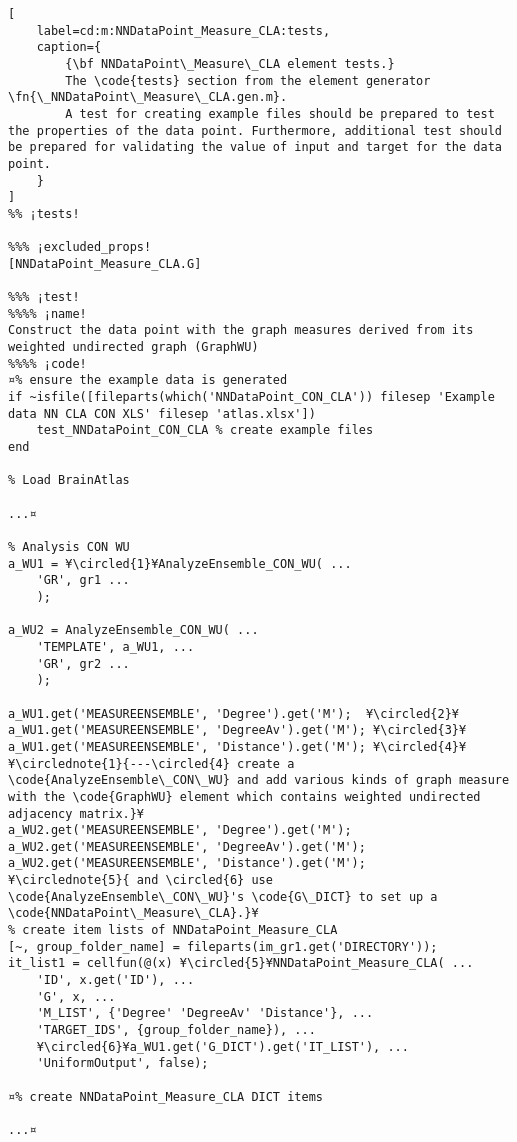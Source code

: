\documentclass{tufte-handout}
\begin{document}
\begin{lstlisting}[
	label=cd:m:NNDataPoint_Measure_CLA:tests,
	caption={
		{\bf NNDataPoint\_Measure\_CLA element tests.}
		The \code{tests} section from the element generator \fn{\_NNDataPoint\_Measure\_CLA.gen.m}.
		A test for creating example files should be prepared to test the properties of the data point. Furthermore, additional test should be prepared for validating the value of input and target for the data point.
	}
]		
%% ¡tests!

%%% ¡excluded_props!
[NNDataPoint_Measure_CLA.G]

%%% ¡test!
%%%% ¡name! 
Construct the data point with the graph measures derived from its weighted undirected graph (GraphWU) 
%%%% ¡code!
¤% ensure the example data is generated
if ~isfile([fileparts(which('NNDataPoint_CON_CLA')) filesep 'Example data NN CLA CON XLS' filesep 'atlas.xlsx'])
    test_NNDataPoint_CON_CLA % create example files
end

% Load BrainAtlas

...¤

% Analysis CON WU
a_WU1 = ¥\circled{1}¥AnalyzeEnsemble_CON_WU( ...
    'GR', gr1 ...
    );

a_WU2 = AnalyzeEnsemble_CON_WU( ...
    'TEMPLATE', a_WU1, ...
    'GR', gr2 ...
    );

a_WU1.get('MEASUREENSEMBLE', 'Degree').get('M');  ¥\circled{2}¥
a_WU1.get('MEASUREENSEMBLE', 'DegreeAv').get('M'); ¥\circled{3}¥ 
a_WU1.get('MEASUREENSEMBLE', 'Distance').get('M'); ¥\circled{4}¥
¥\circlednote{1}{---\circled{4} create a \code{AnalyzeEnsemble\_CON\_WU} and add various kinds of graph measure with the \code{GraphWU} element which contains weighted undirected adjacency matrix.}¥
a_WU2.get('MEASUREENSEMBLE', 'Degree').get('M');
a_WU2.get('MEASUREENSEMBLE', 'DegreeAv').get('M');
a_WU2.get('MEASUREENSEMBLE', 'Distance').get('M');
¥\circlednote{5}{ and \circled{6} use \code{AnalyzeEnsemble\_CON\_WU}'s \code{G\_DICT} to set up a \code{NNDataPoint\_Measure\_CLA}.}¥
% create item lists of NNDataPoint_Measure_CLA
[~, group_folder_name] = fileparts(im_gr1.get('DIRECTORY'));
it_list1 = cellfun(@(x) ¥\circled{5}¥NNDataPoint_Measure_CLA( ...
    'ID', x.get('ID'), ...
    'G', x, ...
    'M_LIST', {'Degree' 'DegreeAv' 'Distance'}, ...
    'TARGET_IDS', {group_folder_name}), ...
    ¥\circled{6}¥a_WU1.get('G_DICT').get('IT_LIST'), ...
    'UniformOutput', false);

¤% create NNDataPoint_Measure_CLA DICT items

...¤


\end{lstlisting}
\end{document}
